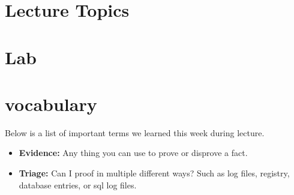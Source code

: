 \documentclass[letterpaper, onecolumn,10pt]{IEEEtran}
\begin{document}
            \subsection{} 
		
		\section{Lecture Topics}
		
		\section{Lab}

		\section{vocabulary}
		    Below is a list of important terms we learned this week during lecture.\\
		    \begin{itemize}
		        \item \textbf{Evidence: } Any thing you can use to prove or disprove a fact.\\
		        \item \textbf{Triage: } Can I proof in multiple different ways? Such as log files, registry, database entries, or sql log files.\\
		    \end{itemize}
		
\end{document}
